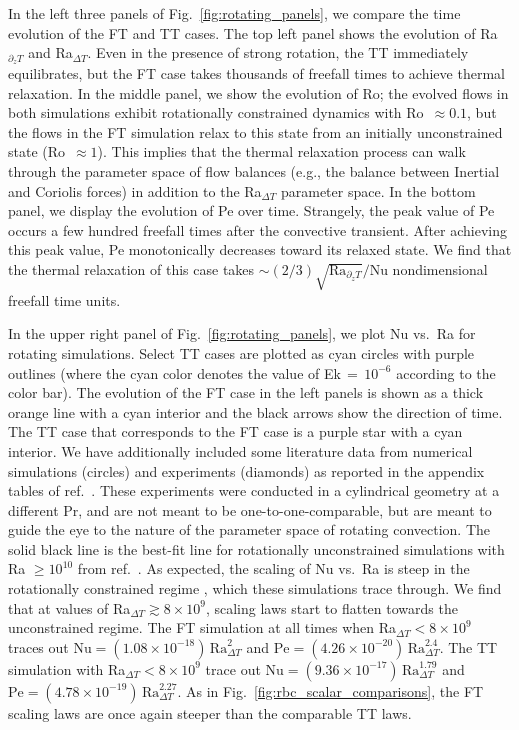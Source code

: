 \documentclass[aps, pre, onecolumn, nofootinbib, notitlepage, groupedaddress, amsfonts, amssymb, amsmath, longbibliography, superscriptaddress]{revtex4-1}
\newcommand{\ea}[1]{{\color{red} #1}}
\begin{document}
In the left three panels of Fig.~\ref{fig:rotating_panels}, we compare the time evolution of the FT and TT cases.
The top left panel shows the evolution of Ra$_{\partial_z T}$ and Ra$_{\Delta T}$.
Even in the presence of strong rotation, the TT immediately equilibrates, but the FT case takes thousands of freefall times to achieve thermal relaxation.
In the middle panel, we show the evolution of Ro; the evolved flows in both simulations exhibit rotationally constrained dynamics with Ro $\,\approx 0.1$, but the flows in the FT simulation relax to this state from an initially unconstrained state (Ro $\,\approx 1$).
This implies that the thermal relaxation process can walk through the parameter space of flow balances (e.g., the balance between Inertial and Coriolis forces) in addition to the Ra$_{\Delta T}$ parameter space.
In the bottom panel, we display the evolution of Pe over time.
Strangely, the peak value of Pe occurs a few hundred freefall times after the convective transient.
After achieving this peak value, Pe monotonically decreases toward its relaxed state.
\ea{We find that the thermal relaxation of this case takes $\sim (2/3)\sqrt{\text{Ra}_{\partial_z T}}/\text{Nu}$ nondimensional freefall time units.}

In the upper right panel of Fig.~\ref{fig:rotating_panels}, we plot Nu vs.~Ra for rotating simulations.
Select TT cases are plotted as cyan circles with purple outlines (where the cyan color denotes the value of Ek$\,=\,10^{-6}$ according to the color bar).
The evolution of the FT case in the left panels is shown as a thick orange line with a cyan interior and the black arrows show the direction of time.
The TT case that corresponds to the FT case is a purple star with a cyan interior.
We have additionally included some literature data from numerical simulations (circles) and experiments (diamonds) as reported in the appendix tables of ref.~\cite{cheng&all2015}.
These experiments were conducted in a cylindrical geometry at a different Pr, and are not meant to be one-to-one-comparable, but are meant to guide the eye to the nature of the parameter space of rotating convection.
The solid black line is the best-fit line for rotationally unconstrained simulations with Ra $\geq 10^{10}$ from ref.~\cite{cheng&all2015}.
As expected, the scaling of Nu vs.~Ra is steep in the rotationally constrained regime \cite{julien&all2012, plumley&julien2019}, which these simulations trace through.
\ea{We find that at values of Ra$_{\Delta T} \gtrsim 8 \times 10^9$, scaling laws start to flatten towards the unconstrained regime.
The FT simulation at all times when Ra$_{\Delta T} < 8 \times 10^9$ traces out $\text{Nu} = (1.08 \times 10^{-18})\,\text{Ra}_{\Delta T}^{2}$ and $\text{Pe} = (4.26 \times 10^{-20})\,\text{Ra}_{\Delta T}^{2.4}$.
The TT simulation with Ra$_{\Delta T} < 8 \times 10^9$ trace out $\text{Nu} = (9.36 \times 10^{-17})\,\text{Ra}_{\Delta T}^{1.79}$ and $\text{Pe} = (4.78 \times 10^{-19})\,\text{Ra}_{\Delta T}^{2.27}$.}
As in Fig.~\ref{fig:rbc_scalar_comparisons}, the FT \ea{scaling laws} are once again \ea{steeper than} the comparable TT \ea{laws}.
\end{document}
